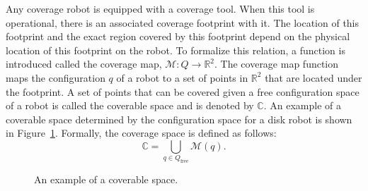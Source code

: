 \documentclass[../main.tex]{subfiles}
\begin{document}
Any coverage robot is equipped with a coverage tool. When this tool is operational, there is an associated coverage footprint with it. The location of this footprint and the exact region covered by this footprint depend on the physical location of this footprint on the robot. To formalize this relation, a function is introduced called the coverage map, $\mathcal{M}:Q\to \mathbb{R}^2$. The coverage map function maps the configuration $q$ of a robot to a set of points in $\mathbb{R}^2$ that are located under the footprint. A set of points that can be covered given a free configuration space of a robot is called the coverable space and is denoted by $\mathbb{C}$. An example of a coverable space determined by the configuration space for a disk robot is shown in Figure~\ref{fig:coverable_space}. Formally, the coverage space is defined as follows:
\begin{equation}
	\mathbb{C}=\bigcup_{q\in Q_{\text{free}}}\mathcal{M}(q).
\end{equation}
\begin{figure}
	\centering
	
	\caption{An example of a coverable space.}
	\label{fig:coverable_space}
\end{figure}










\end{document}
